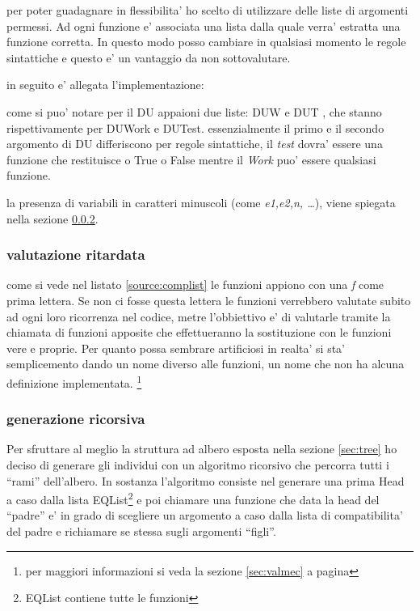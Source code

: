\documentclass[12pt, a4paper]{article}
\begin{document}
per poter guadagnare in flessibilita' ho scelto di utilizzare delle liste di argomenti permessi. Ad ogni funzione e' associata una lista dalla quale verra' estratta una funzione corretta. In questo modo posso cambiare in qualsiasi momento le regole sintattiche e questo e' un vantaggio da non sottovalutare.

in seguito e' allegata l'implementazione:

\lstset{caption=liste compatibilita',
		label=source:complist}


come si puo' notare per il DU appaioni due liste: DUW e DUT , che stanno rispettivamente per DUWork e DUTest. essenzialmente il primo e il secondo argomento di DU differiscono per regole sintattiche, il {\itshape test} dovra' essere una funzione che restituisce o True o False mentre il {\itshape Work} puo' essere qualsiasi funzione.

la presenza di variabili in caratteri minuscoli (come {\itshape e1,e2,n, \ldots}), viene spiegata nella sezione \ref{sec:generic}.

\subsubsection{valutazione ritardata}
come si vede nel listato \ref{source:complist} le funzioni appiono con una {\itshape f} come prima lettera. Se non ci fosse questa lettera le funzioni verrebbero valutate subito ad ogni loro ricorrenza nel codice, metre l'obbiettivo e' di valutarle tramite la chiamata di funzioni apposite che effettueranno la sostituzione con le funzioni vere e proprie. Per quanto possa sembrare artificiosi in realta' si sta' semplicemento dando un nome diverso alle funzioni, un nome che non ha alcuna definizione implementata. \footnote{per maggiori informazioni si veda la sezione \ref{sec:valmec} a pagina \pageref{sec:valmec}}

\subsubsection{generazione ricorsiva}
\label{sec:generic}
Per sfruttare al meglio la struttura ad albero esposta nella sezione \ref{sec:tree} ho deciso di generare gli individui con un algoritmo ricorsivo che percorra tutti i ``rami'' dell'albero.
In sostanza l'algoritmo consiste nel generare una prima Head a caso dalla lista EQList\footnote{EQList contiene tutte le funzioni} e poi chiamare una funzione che data la head del ``padre''  e' in grado di scegliere un argomento a caso dalla lista di compatibilita' del padre e richiamare se stessa sugli argomenti ``figli''.
\end{document}
